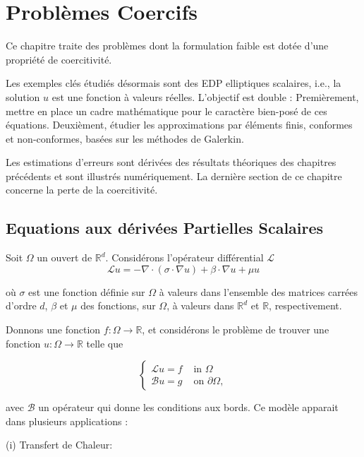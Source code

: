 \chapter{Problèmes Coercifs}
Ce chapitre traite des problèmes dont la formulation faible est dotée d'une propriété de coercitivité. 

Les exemples clés étudiés désormais sont des EDP elliptiques scalaires, i.e.,  la solution $u$ est une fonction à valeurs réelles. 
L'objectif est double : Premièrement, mettre en place
un cadre mathématique pour le caractère bien-posé de ces équations. Deuxièment, étudier les approximations  par éléments finis,  conformes et non-conformes,  basées sur les méthodes de Galerkin.

Les estimations d'erreurs sont dérivées des résultats théoriques des chapitres  précédents 
et sont illustrés numériquement. La dernière section de ce chapitre concerne la 
 perte de la  coercitivité. 
 
\section{Equations aux dérivées Partielles Scalaires}


Soit  $\Omega$ un ouvert de  $\mathbb{R}^{d}$. Considérons  l'opérateur différential   $\mathcal{L}$ 
$$
\mathcal{L} u=-\nabla \cdot(\sigma \cdot \nabla u)+\beta \cdot \nabla u+\mu u
$$

où  $\sigma$ est une fonction définie sur $\Omega$ à valeurs  dans l'ensemble des matrices  carrées d'ordre $d$,  $\beta$ et $\mu$ des   fonctions, sur $\Omega$,  à valeurs dans $\mathbb{R}^{d}$ et  $\mathbb{R}$, respectivement. 

Donnons une fonction $f: \Omega \rightarrow \mathbb{R}$, et considérons le  problème  de trouver une  fonction $u: \Omega \rightarrow \mathbb{R}$ telle que 

\begin{equation}\label{eleq}
\left\{\begin{array}{ll}
	\mathcal{L} u=f & \text { in } \Omega \\
	\mathcal{B} u=g & \text { on } \partial \Omega, 
\end{array}\right.
\end{equation}

avec  $\mathcal{B}$  un opérateur qui donne les conditions aux bords.   Ce  modèle  apparait dans plusieurs  applications :


(i) Transfert de Chaleur: 

